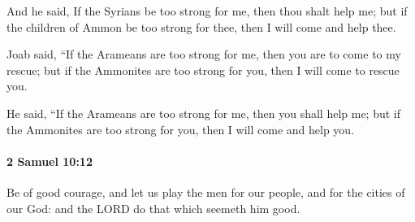 			\begin{versebox}
					\item[BHS] 
					\item[ASV] And he said, If the Syrians be too strong for me, then thou shalt help me; but if the children of Ammon be too strong for thee, then I will come and help thee.
					\item[NIV] Joab said, “If the Arameans are too strong for me, then you are to come to my rescue; but if the Ammonites are too strong for you, then I will come to rescue you.
					\item[NRSV] He said, “If the Arameans are too strong for me, then you shall help me; but if the Ammonites are too strong for you, then I will come and help you.
			\end{versebox}

		\paragraph{2 Samuel 10:12} %
			\label{2SAMUEL-10-12}

			Be of good courage, and let us play the men for our people, and for the cities of our God: and the LORD do that which seemeth him good.

